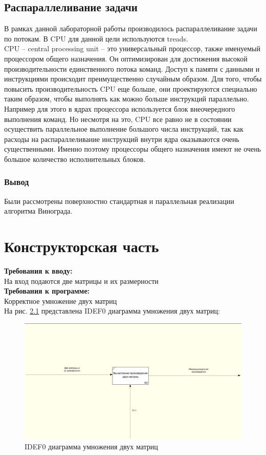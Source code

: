 \documentclass[12pt]{report}
\begin{document}
\section{Распараллеливание задачи}
В рамках данной лабораторной работы производилось распараллеливание задачи по потокам. В CPU для данной цели используются treads.  \\
	
	CPU – central processing unit – это универсальный процессор, также именуемый процессором общего назначения. Он оптимизирован для достижения высокой производительности единственного потока команд. Доступ к памяти с данными и инструкциями происходит преимущественно случайным образом.
Для того, чтобы повысить производительность CPU еще больше, они проектируются специально таким образом, чтобы выполнять как можно больше инструкций параллельно. Например для этого в ядрах процессора используется блок внеочередного выполнения команд.	
Но несмотря на это, CPU все равно не в состоянии осуществить параллельное выполнение большого числа инструкций, так как расходы на распараллеливание инструкций внутри ядра оказываются очень существенными. Именно поэтому процессоры общего назначения имеют не очень большое количество исполнительных блоков.


\subsection{Вывод}
Были рассмотрены поверхностно стандартная и параллельная реализации алгоритма Винограда.


\chapter{Конструкторская часть}
\textbf{Требования к вводу:}\\
На вход подаются две матрицы и их размерности\\
\textbf{Требования к программе:}\\
Корректное умножение двух матриц \\

На рис. \ref{fig:def} представлена IDEF0 диаграмма умножения двух матриц:
	
	\begin{figure}[h]
        	\begin{center}
        		\includegraphics[scale=0.6]{idef}
        		\caption{IDEF0 диаграмма умножения двух матриц}
        		\label{fig:def}
        	\end{center}
        \end{figure}
\end{document}
